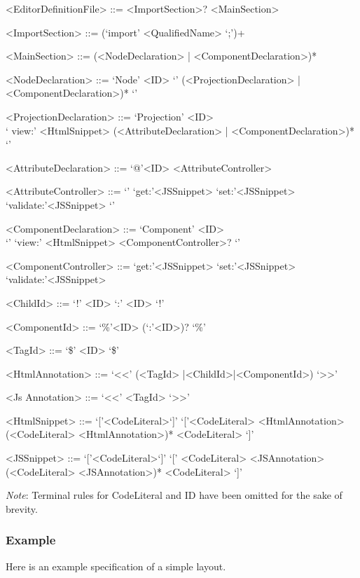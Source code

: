 \documentclass{article}
\begin{document}
\begin{grammar}

<EditorDefinitionFile> ::= <ImportSection>? <MainSection>

<ImportSection> ::= (`import' <QualifiedName> `;')+ 

<MainSection> ::= (<NodeDeclaration> | <ComponentDeclaration>)*

<NodeDeclaration> ::= `Node' <ID> `{' (<ProjectionDeclaration> | <ComponentDeclaration>)* `}'

<ProjectionDeclaration> ::= `Projection' <ID> \\ `{ view:' <HtmlSnippet> (<AttributeDeclaration> | <ComponentDeclaration>)* `}'

<AttributeDeclaration> ::= `@'<ID> <AttributeController>

<AttributeController> ::= `{' `get:'<JSSnippet> `set:'<JSSnippet> `validate:'<JSSnippet> `}'

<ComponentDeclaration> ::= `Component' <ID> \\`{' `view:' <HtmlSnippet> <ComponentController>? `}'

<ComponentController> ::= `get:'<JSSnippet> `set:'<JSSnippet> `validate:'<JSSnippet> 
 
<ChildId> ::= `!' <ID> `:' <ID> `!'
 
<ComponentId> ::= `\%'<ID> (`:'<ID>)? `\%'

<TagId> ::= `\$' <ID> `\$' 

<HtmlAnnotation> ::= `<<' (<TagId> |<ChildId>|<ComponentId>) `>>'

<Js	Annotation> ::= `<<' <TagId> `>>'

<HtmlSnippet> ::= `['<CodeLiteral>`]'
\alt `['<CodeLiteral> <HtmlAnnotation> (<CodeLiteral> <HtmlAnnotation>)*  <CodeLiteral> `]'

<JSSnippet> ::= `['<CodeLiteral>`]'
\alt `[' <CodeLiteral> <JSAnnotation> (<CodeLiteral> <JSAnnotation>)*  <CodeLiteral> `]'


\end{grammar}

\emph{Note}: Terminal rules for CodeLiteral and ID have been omitted for the sake of brevity.

\subsubsection{Example}
Here is an example specification of a simple layout.
\end{document}

